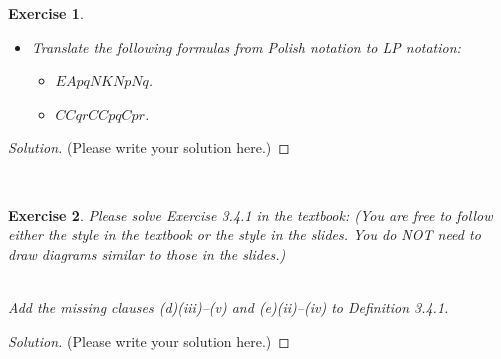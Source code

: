 \documentclass[12pt,a4paper]{article}
\theoremstyle{plain}
\newtheorem{exercise}{Exercise}
\begin{document}
\begin{exercise}
\begin{itemize}
\begin{itemize}
\item[(i)] $(p \wedge (q \vee (\neg p)))$.

\item[(ii)] $(((p \rightarrow q) \rightarrow p) \rightarrow p)$.

\end{itemize}

\item[(d)] Translate the following formulas from Polish notation to LP notation:
\begin{itemize}

\item[(i)] $EApqNKNpNq$.

\item[(ii)] $CCqrCCpqCpr$.

\end{itemize}

\end{itemize}
\end{exercise}

\begin{proof}[Solution]
(Please write your solution here.)
\end{proof}

\ \\
\begin{exercise}
Please solve Exercise 3.4.1 in the textbook: (You are free to follow either the style in the textbook or the style in the slides.
You do NOT need to draw diagrams similar to those in the slides.)

\ \\
Add the missing clauses (d)(iii)–(v) and (e)(ii)–(iv) to Definition 3.4.1.
\end{exercise}

\begin{proof}[Solution]
(Please write your solution here.)
\end{proof}
\end{document}

